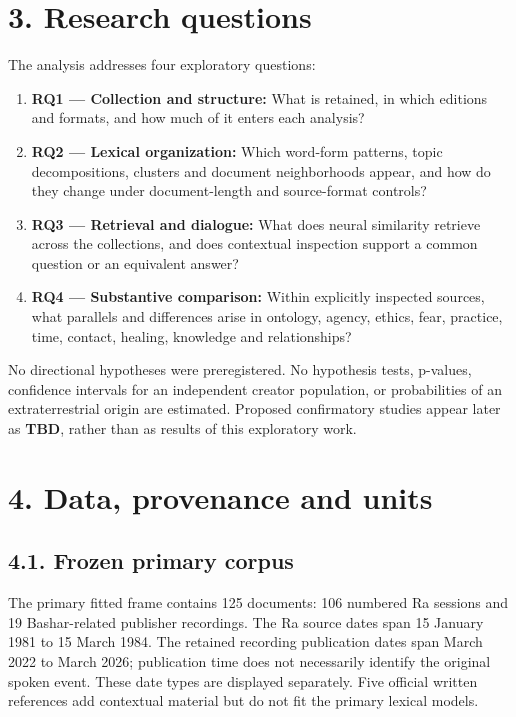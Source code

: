 \documentclass[
  11pt,
]{article}
\providecommand{\tightlist}{%
  \setlength{\itemsep}{0pt}\setlength{\parskip}{0pt}}
\begin{document}
\FloatBarrier

\section{3. Research questions}\label{research-questions}

The analysis addresses four exploratory questions:

\begin{enumerate}
\def\labelenumi{\arabic{enumi}.}
\tightlist
\item
  \textbf{RQ1 --- Collection and structure:} What is retained, in which
  editions and formats, and how much of it enters each analysis?
\item
  \textbf{RQ2 --- Lexical organization:} Which word-form patterns, topic
  decompositions, clusters and document neighborhoods appear, and how do
  they change under document-length and source-format controls?
\item
  \textbf{RQ3 --- Retrieval and dialogue:} What does neural similarity
  retrieve across the collections, and does contextual inspection
  support a common question or an equivalent answer?
\item
  \textbf{RQ4 --- Substantive comparison:} Within explicitly inspected
  sources, what parallels and differences arise in ontology, agency,
  ethics, fear, practice, time, contact, healing, knowledge and
  relationships?
\end{enumerate}

No directional hypotheses were preregistered. No hypothesis tests,
p-values, confidence intervals for an independent creator population, or
probabilities of an extraterrestrial origin are estimated. Proposed
confirmatory studies appear later as \textbf{TBD}, rather than as
results of this exploratory work.

\FloatBarrier

\section{4. Data, provenance and units}\label{data-provenance-and-units}

\FloatBarrier

\subsection{4.1. Frozen primary corpus}\label{frozen-primary-corpus}

The primary fitted frame contains 125 documents: 106 numbered Ra
sessions and 19 Bashar-related publisher recordings. The Ra source dates
span 15 January 1981 to 15 March 1984. The retained recording
publication dates span March 2022 to March 2026; publication time does
not necessarily identify the original spoken event. These date types are
displayed separately. Five official written references add contextual
material but do not fit the primary lexical models.
\end{document}
